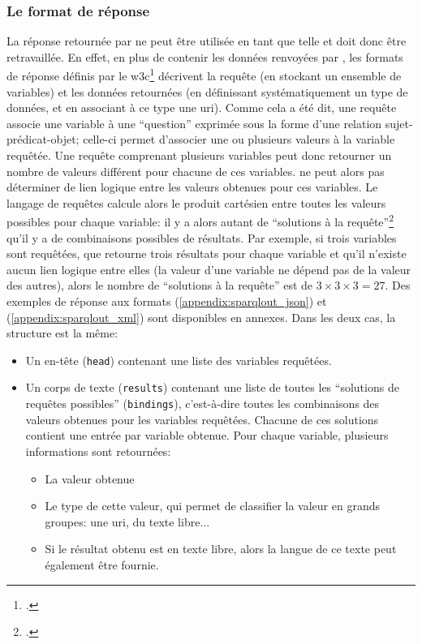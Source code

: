 \subsubsection{Le format de réponse}
La réponse retournée par \wkd{} ne peut être utilisée en tant que telle et doit donc être retravaillée. En effet, en plus de contenir les données renvoyées par \sparql{}, les formats de réponse définis par le \gls{w3c}\footcite{beckett_sparql_2013} décrivent la requête (en stockant un ensemble de variables) et les données retournées (en définissant systématiquement un type de données, et en associant à ce type une \gls{uri}). Comme cela a été dit, une requête \sparql{} associe une variable à une \enquote{question} exprimée sous la forme d'une relation sujet-prédicat-objet; celle-ci permet d'associer une ou plusieurs valeurs à la variable requêtée. Une requête comprenant plusieurs variables peut donc retourner un nombre de valeurs différent pour chacune de ces variables. \sparql{} ne peut alors pas déterminer de lien logique entre les valeurs obtenues pour ces variables. Le langage de requêtes calcule alors le produit cartésien entre toutes les valeurs possibles pour chaque variable: il y a alors autant de \enquote{solutions à la requête}\footcite[§2.3.1. Variable Binding Results]{beckett_sparql_2013} qu'il y a de combinaisons possibles de résultats. Par exemple, si trois variables sont requêtées, que \sparql{} retourne trois résultats pour chaque variable et qu'il n'existe aucun lien logique entre elles (la valeur d'une variable ne dépend pas de la valeur des autres), alors le nombre de \enquote{solutions à la requête} est de \(3 \times 3 \times 3 = 27\). Des exemples de réponse aux formats \json{} (\ref{appendix:sparqlout_json}) et \xml{} (\ref{appendix:sparqlout_xml}) sont disponibles en annexes. Dans les deux cas, la structure est la même:

\begin{itemize}
	\item Un en-tête (\texttt{head}) contenant une liste des variables requêtées.
	\item Un corps de texte (\texttt{results}) contenant une liste de toutes les \enquote{solutions de requêtes possibles} (\texttt{bindings}), c'est-à-dire toutes les combinaisons des valeurs obtenues pour les variables requêtées. Chacune de ces solutions contient une entrée par variable obtenue. Pour chaque variable, plusieurs informations sont retournées:
	\begin{itemize}
		\item La valeur obtenue
		\item Le type de cette valeur, qui permet de classifier la valeur en grands groupes: une \gls{uri}, du texte libre... 
		\item Si le résultat obtenu est en texte libre, alors la langue de ce texte peut également être fournie.
	\end{itemize} 
\end{itemize}

